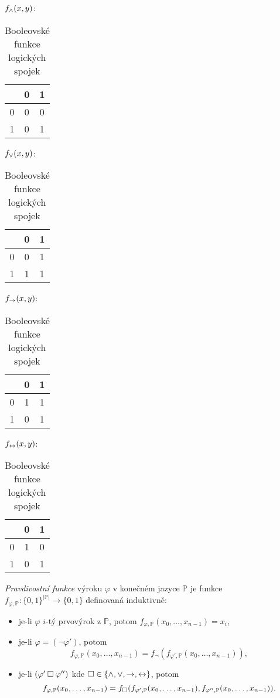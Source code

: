 \begin{table}
\centering
$f_{\land}(x,y)$:
\begin{tabular}{c|cc}
      & 0 & 1  \\ \hline
    0 & 0 & 0  \\
    1 & 0 & 1
\end{tabular}\quad
$f_{\lor}(x,y)$:
\begin{tabular}{c|cc}
      & 0 & 1  \\ \hline
    0 & 0 & 1  \\
    1 & 1 & 1
\end{tabular}\quad
$f_{\mathbin{\rightarrow}}(x,y)$:
\begin{tabular}{c|cc}
      & 0 & 1  \\ \hline
    0 & 1 & 1  \\
    1 & 0 & 1
\end{tabular}\quad
$f_{\mathbin{\leftrightarrow}}(x,y)$:
\begin{tabular}{c|cc}
      & 0 & 1  \\ \hline
    0 & 1 & 0  \\
    1 & 0 & 1
\end{tabular}
\caption{Booleovské funkce logických spojek}
\label{table:boolean-functions-for-logical-connectives}
\end{table}

\begin{definition}\label{definition:truth-function}
\emph{Pravdivostní funkce} výroku $\varphi$ v konečném jazyce $\mathbb P$ je funkce  $f_{\varphi,\mathbb P}\colon\{0,1\}^{|\mathbb P|}\to\{0,1\}$ definovaná induktivně:
\begin{itemize}
    \item je-li $\varphi$ $i$-tý prvovýrok z $\mathbb P$, potom $f_{\varphi,\mathbb P}(x_0,\dots,x_{n-1})=x_i$,
    \item je-li $\varphi=(\neg\varphi')$, potom
    $$
    f_{\varphi,\mathbb P}(x_0,\dots,x_{n-1})=f_\neg(f_{\varphi',\mathbb P}(x_0,\dots,x_{n-1})),$$
    \item je-li $(\varphi'\mathbin{\square}\varphi'')$ kde ${\mathbin{\square}}\in\{{\land},{\lor},{\mathbin{\rightarrow}},{\mathbin{\leftrightarrow}}\}$, potom
    $$
    f_{\varphi,\mathbb P}(x_0,\dots,x_{n-1})=f_{\mathbin{\square}}(f_{\varphi',\mathbb P}(x_0,\dots,x_{n-1}), f_{\varphi'',\mathbb P}(x_0,\dots,x_{n-1})).
    $$
\end{itemize}
\end{definition}

